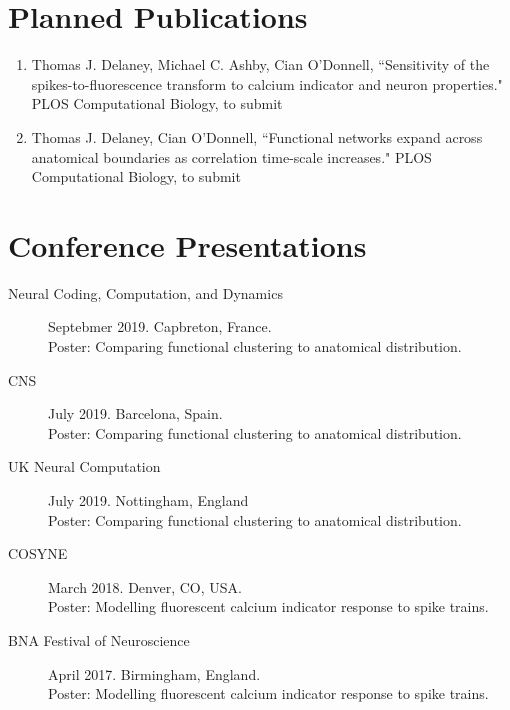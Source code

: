 \documentclass[a4paper,12pt]{article}
\begin{document}
\section*{Planned Publications}
  \begin{enumerate}
    \item Thomas J. Delaney, Michael C. Ashby, Cian O'Donnell, 
      ``Sensitivity of the spikes-to-fluorescence transform to calcium indicator and neuron properties."
      PLOS Computational Biology,
      to submit
    \item Thomas J. Delaney, Cian O'Donnell,
      ``Functional networks expand across anatomical boundaries as correlation time-scale increases."
      PLOS Computational Biology,
      to submit      
  \end{enumerate}

\section*{Conference Presentations}
  \begin{description}
    \item[Neural Coding, Computation, and Dynamics] Septebmer 2019. Capbreton, France. \\
      Poster: Comparing functional clustering to anatomical distribution.
    \item[CNS] July 2019. Barcelona, Spain. \\
      Poster: Comparing functional clustering to anatomical distribution.
    \item[UK Neural Computation] July 2019. Nottingham, England \\
      Poster: Comparing functional clustering to anatomical distribution.
    \item[COSYNE] March 2018. Denver, CO, USA. \\
      Poster: Modelling fluorescent calcium indicator response to spike trains.
    \item[BNA Festival of Neuroscience] April 2017. Birmingham, England. \\
      Poster: Modelling fluorescent calcium indicator response to spike trains.
  \end{description}
\end{document}
